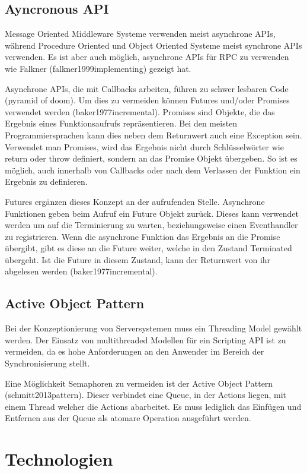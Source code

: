 \subsection{Ayncronous API}
Message Oriented Middleware Systeme verwenden meist asynchrone APIs, während Procedure Oriented und Object Oriented Systeme meist synchrone APIs verwenden.
Es ist aber auch möglich, asynchrone APIs für RPC zu verwenden wie Falkner (falkner1999implementing) gezeigt hat.

Asynchrone APIs, die mit Callbacks arbeiten, führen zu schwer lesbaren Code (pyramid of doom).
Um dies zu vermeiden können Futures und/oder Promises verwendet werden (baker1977incremental).
Promises sind Objekte, die das Ergebnis eines Funktionsaufrufs repräsentieren.
Bei den meisten Programmiersprachen kann dies neben dem Returnwert auch eine Exception sein.
Verwendet man Promises, wird das Ergebnis nicht durch Schlüsselwörter wie return oder throw definiert, sondern an das Promise Objekt übergeben.
So ist es möglich, auch innerhalb von Callbacks oder nach dem Verlassen der Funktion ein Ergebnis zu definieren.

Futures ergänzen dieses Konzept an der aufrufenden Stelle.
Asynchrone Funktionen geben beim Aufruf ein Future Objekt zurück.
Dieses kann verwendet werden um auf die Terminierung zu warten, beziehungsweise einen Eventhandler zu registrieren.
Wenn die asynchrone Funktion das Ergebnis an die Promise übergibt, gibt es diese an die Future weiter, welche in den Zustand Terminated übergeht.
Ist die Future in diesem Zustand, kann der Returnwert von ihr abgelesen werden (baker1977incremental).




\subsection{Active Object Pattern}
Bei der Konzeptionierung von Serversystemen muss ein Threading Model gewählt werden.
Der Einsatz von multithreaded Modellen für ein Scripting API ist zu vermeiden, da es hohe Anforderungen an den Anwender im Bereich der Synchronisierung stellt.

Eine Möglichkeit Semaphoren zu vermeiden ist der Active Object Pattern (schmitt2013pattern).
Dieser verbindet eine Queue, in der Actions liegen, mit einem Thread welcher die Actions abarbeitet.
Es muss lediglich das Einfügen und Entfernen aus der Queue als atomare Operation ausgeführt werden.




\section{Technologien}

